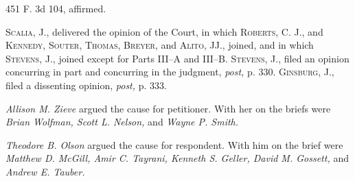 451 F. 3d 104, affirmed.

  \textsc{Scalia,} J., delivered the opinion of the Court, in which
\textsc{Roberts,} C. J., and \textsc{Kennedy, Souter, Thomas, Breyer,} and
\textsc{Alito,} JJ., joined, and in which \textsc{Stevens,} J., joined except
for Parts III--A and III--B. \textsc{Stevens,} J., filed an opinion
concurring in part and concurring in the judgment, \emph{post,} p. 330.
\textsc{Ginsburg,} J., filed a dissenting opinion, \emph{post,} p. 333.
\newpage 

  \emph{Allison M. Zieve} argued the cause for petitioner. With her on the
briefs were \emph{Brian Wolfman, Scott L. Nelson,} and \emph{Wayne P. Smith.}

  \emph{Theodore B. Olson} argued the cause for respondent. With him on
the brief were \emph{Matthew D. McGill, Amir C. Tayrani, Kenneth S. Geller,
David M. Gossett,} and \emph{Andrew E. Tauber.}

